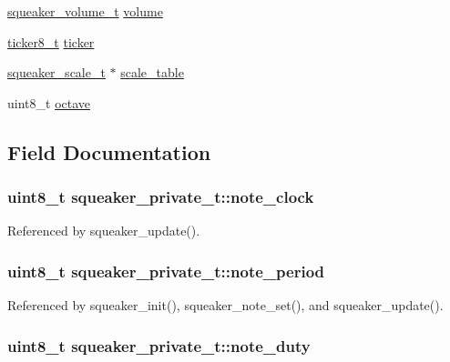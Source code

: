 \begin{CompactItemize}
\item 
\hyperlink{squeaker_8h_ff6ff3c497a073fb9081c6f0873060c4}{squeaker\_\-volume\_\-t} \hyperlink{structsqueaker__private__t_aa144fd704f02c394c6c9dbd4e77f009}{volume}
\item 
\hyperlink{structticker8__t}{ticker8\_\-t} \hyperlink{structsqueaker__private__t_e56e5ae9f7afd550010187b2e11cb061}{ticker}
\item 
\hyperlink{squeaker_8h_62cacde75ab4085a503fc8f252addd06}{squeaker\_\-scale\_\-t} $\ast$ \hyperlink{structsqueaker__private__t_4f554f30cbf7db6cc5b642d0517591eb}{scale\_\-table}
\item 
uint8\_\-t \hyperlink{structsqueaker__private__t_b5652cbd8b09f0cd2da88662ba07e3ee}{octave}
\end{CompactItemize}


\subsection{Field Documentation}
\hypertarget{structsqueaker__private__t_372154b877a2a8d9faf23b335a27b181}{
\subsubsection{\setlength{\rightskip}{0pt plus 5cm}uint8\_\-t {\bf squeaker\_\-private\_\-t::note\_\-clock}}}
\label{structsqueaker__private__t_372154b877a2a8d9faf23b335a27b181}




Referenced by squeaker\_\-update().\hypertarget{structsqueaker__private__t_c19828d0be7f4938c7676bf1547623c7}{
\subsubsection{\setlength{\rightskip}{0pt plus 5cm}uint8\_\-t {\bf squeaker\_\-private\_\-t::note\_\-period}}}
\label{structsqueaker__private__t_c19828d0be7f4938c7676bf1547623c7}




Referenced by squeaker\_\-init(), squeaker\_\-note\_\-set(), and squeaker\_\-update().\hypertarget{structsqueaker__private__t_af9ffc0b06a83522a648d1b429f8e435}{
\subsubsection{\setlength{\rightskip}{0pt plus 5cm}uint8\_\-t {\bf squeaker\_\-private\_\-t::note\_\-duty}}}
\label{structsqueaker__private__t_af9ffc0b06a83522a648d1b429f8e435}




